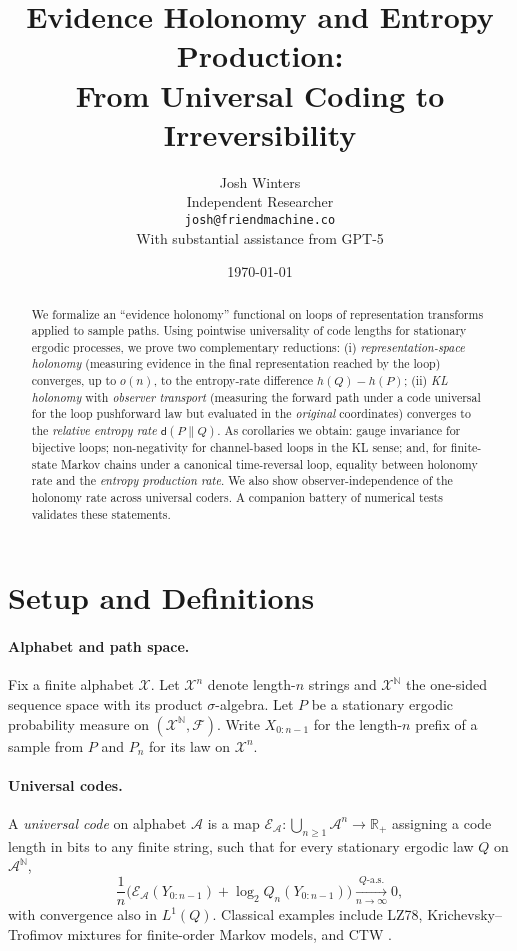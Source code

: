 \documentclass[11pt]{article}
\title{Evidence Holonomy and Entropy Production:\\
From Universal Coding to Irreversibility}
\author{Josh Winters\\Independent Researcher\\\texttt{josh@friendmachine.co}\\[0.25em]\small With substantial assistance from GPT-5}
\date{\today}
\newcommand{\X}{\mathcal{X}}
\newcommand{\N}{\mathbb{N}}
\newcommand{\1}{\mathbbm{1}}
\newcommand{\code}{\mathcal{E}}
\newcommand{\RR}{\mathbb{R}}
\begin{document}
\maketitle

\begin{abstract}
We formalize an ``evidence holonomy'' functional on loops of representation transforms applied to sample paths. Using pointwise universality of code lengths for stationary ergodic processes, we prove two complementary reductions:
(i) \emph{representation-space holonomy} (measuring evidence in the final representation reached by the loop) converges, up to $o(n)$, to the entropy-rate difference $h(Q)-h(P)$; (ii) \emph{KL holonomy} with \emph{observer transport} (measuring the forward path under a code universal for the loop pushforward law but evaluated in the \emph{original} coordinates) converges to the \emph{relative entropy rate} $\mathsf{d}(P\|Q)$. As corollaries we obtain: gauge invariance for bijective loops; non-negativity for channel-based loops in the KL sense; and, for finite-state Markov chains under a canonical time-reversal loop, equality between holonomy rate and the \emph{entropy production rate}. We also show observer-independence of the holonomy rate across universal coders. A companion battery of numerical tests validates these statements.
\end{abstract}

\section{Setup and Definitions}

\paragraph{Alphabet and path space.} Fix a finite alphabet $\X$. Let $\X^n$ denote length-$n$ strings and $\X^{\N}$ the one-sided sequence space with its product $\sigma$-algebra. Let $P$ be a stationary ergodic probability measure on $(\X^{\N},\mathcal{F})$. Write $X_{0:n-1}$ for the length-$n$ prefix of a sample from $P$ and $P_n$ for its law on $\X^n$.

\paragraph{Universal codes.}
A \emph{universal code} on alphabet $\mathcal{A}$ is a map $\code_{\mathcal{A}}:\bigcup_{n\ge 1}\mathcal{A}^n\to \RR_+$ assigning a code length in bits to any finite string, such that for every stationary ergodic law $Q$ on $\mathcal{A}^{\N}$,
\begin{equation}\label{eq:universality}
\frac{1}{n}\Big(\code_{\mathcal{A}}(Y_{0:n-1}) + \log_2 Q_n(Y_{0:n-1})\Big) \xrightarrow[n\to\infty]{Q\text{-a.s.}} 0,
\end{equation}
with convergence also in $L^1(Q)$. Classical examples include LZ78, Krichevsky--Trofimov mixtures for finite-order Markov models, and CTW \cite{ziv1978,kt1981,willems1995ctw,shields1996,csiszarshields2004}.
\end{document}
